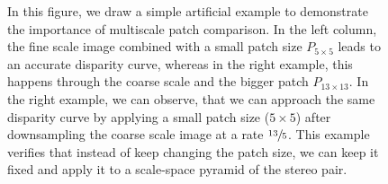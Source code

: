\documentclass[10pt]{article}
\begin{document}
\begin{figure}[t]
\vspace{-15pt}
\caption{In this figure, we draw a simple artificial example to demonstrate the importance of multiscale patch comparison. In the left column, the fine scale image combined with a small patch size $P_{5 \times 5}$ leads to an accurate disparity curve, whereas in the right example, this happens through the coarse scale and the bigger patch $P_{13 \times 13}$. In the right example, we can observe, that we can approach the same disparity curve by applying a small patch size ($5 \times 5$) after downsampling the coarse scale image at a rate $\sfrac{13}{5}$. This example verifies that instead of keep changing the patch size, we can keep it fixed and apply it to a scale-space pyramid of the stereo pair.}

\end{figure}
\end{document}

